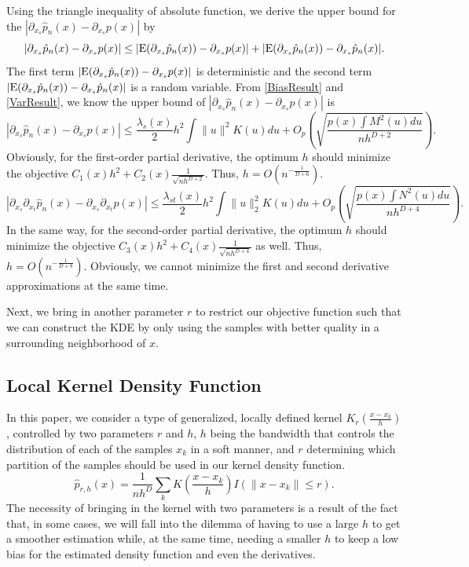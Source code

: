 \documentclass[aos,preprint]{imsart}
\theoremstyle{remark}
\begin{document}
Using the triangle inequality of absolute function, we derive the upper bound for the $|\partial_{x_s} \hat{p}_n(x) - \partial_{x_s} p(x)|$ by
\[
|\partial_{x_s} \hat{p}_n(x) - \partial_{x_s} p(x)|\leq |{\rm E}(\partial_{x_s}  \hat{p}_n(x)) - \partial_{x_s}p(x)|+ |{\rm E}  (\partial_{x_s} \hat{p}_n(x)) -\partial_{x_s}\hat{p}_n(x)| .
\]
The first term $|{\rm E}(\partial_{x_s}  \hat{p}_n(x)) - \partial_{x_s}p(x)|$ is deterministic and the second term $|{\rm E}  (\partial_{x_s} \hat{p}_n(x)) -\partial_{x_s}\hat{p}_n(x)|$ is a random variable. From \eqref{BiasResult} and \eqref{VarResult}, we know the upper bound of $|\partial_{x_s} \hat{p}_n(x) - \partial_{x_s} p(x)| $ is
\[
|\partial_{x_s} \hat{p}_n(x) - \partial_{x_s} p(x)| \leq  \frac{\lambda_s(x)}{2} h^2 \int \|u\|^2 K(u) du +O_p( \sqrt{\frac{p(x)\int M^2(u)du}{n h^{D+2}} } ).
\]
Obviously, for the first-order partial derivative, the optimum $h$ should minimize the objective $C_1(x)h^2+C_2(x)\frac{1}{\sqrt{n h^{D+2}}}$. Thus, $h = O({n^{-\frac{1}{D+6}}})$.
\[
|\partial_{x_s}\partial_{x_t} \hat{p}_n(x) - \partial_{x_s}\partial_{x_t} p(x)| \leq \frac{\lambda_{st}(x)}{2} h^2 \int \|u\|_2^2 K(u) du + O_p(\sqrt{\frac{p(x)\int N^2(u)du}{nh^{D+4}}}).
\]
In the same way, for the second-order partial derivative, the optimum $h$ should minimize the objective $C_3(x)h^2+C_4(x)\frac{1}{\sqrt{n h^{D+4}}}$ as well. Thus, $h = O(n^{-\frac{1}{D+8}})$. Obviously, we cannot minimize the first and second derivative approximations at the same time.

Next, we bring in another parameter $r$ to restrict our objective function such that we can construct the KDE by only using the samples with better quality in a surrounding neighborhood of $x$.
\subsection{Local Kernel Density Function}
In this paper, we consider a type of generalized, locally defined kernel $K_r (\frac{x-x_k}{h})$, controlled by two parameters $r$ and $h$, $h$ being the bandwidth that controls the distribution of each of the samples $x_k$ in a soft manner, and $r$ determining which partition of the samples should be used in our kernel density function.
\begin{equation}\label{GKDE}
\hat{p}_{r, h}(x) = \frac{1}{n h^D}\sum_k K(\frac{x-x_k}{h}) I(\|x -x_k\|\leq r).
\end{equation}
The necessity of bringing in the kernel with two parameters is a result of the fact that, in some cases, we will fall into the dilemma of having to use a large $h$ to get a smoother estimation while, at the same time, needing a smaller $h$ to keep a low bias for the estimated density function and even the derivatives.
\end{document}
